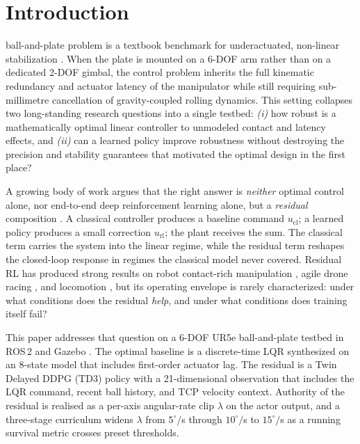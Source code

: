 \documentclass[conference]{IEEEtran}
\begin{document}
\section{Introduction}
 ball-and-plate problem is a textbook benchmark for
underactuated, non-linear stabilization \cite{Spong2020,Awtar2002}. When the
plate is mounted on a 6-DOF arm rather than on a dedicated 2-DOF gimbal, the
control problem inherits the full kinematic redundancy and actuator latency
of the manipulator while still requiring sub-millimetre cancellation of
gravity-coupled rolling dynamics. This setting collapses two long-standing
research questions into a single testbed: \emph{(i)} how robust is a
mathematically optimal linear controller to unmodeled contact and latency
effects, and \emph{(ii)} can a learned policy improve robustness without
destroying the precision and stability guarantees that motivated the optimal
design in the first place?

A growing body of work argues that the right answer is \emph{neither}
optimal control alone, nor end-to-end deep reinforcement learning alone, but a
\emph{residual} composition \cite{Johannink2019,Silver2018,Iwata2021}. A
classical controller produces a baseline command $u_{\text{cl}}$; a learned
policy produces a small correction $u_{\text{rl}}$; the plant receives the
sum. The classical term carries the system into the linear regime, while the
residual term reshapes the closed-loop response in regimes the classical
model never covered. Residual RL has produced strong results on robot
contact-rich manipulation \cite{Johannink2019}, agile drone racing
\cite{Kaufmann2023}, and locomotion \cite{Hwangbo2019}, but its operating
envelope is rarely characterized: under what conditions does the residual
\emph{help}, and under what conditions does training itself fail?

This paper addresses that question on a 6-DOF UR5e ball-and-plate testbed in
ROS\,2 \cite{Macenski2022} and Gazebo \cite{Koenig2004}. The optimal baseline
is a discrete-time LQR \cite{Anderson1990} synthesized on an 8-state model
that includes first-order actuator lag. The residual is a Twin Delayed DDPG
(TD3) policy \cite{Fujimoto2018} with a 21-dimensional observation that
includes the LQR command, recent ball history, and TCP velocity context.
Authority of the residual is realised as a per-axis angular-rate clip
$\lambda$ on the actor output, and a three-stage curriculum widens
$\lambda$ from $5^\circ/$s through $10^\circ/$s to $15^\circ/$s as a
running survival metric crosses preset thresholds.
\end{document}
